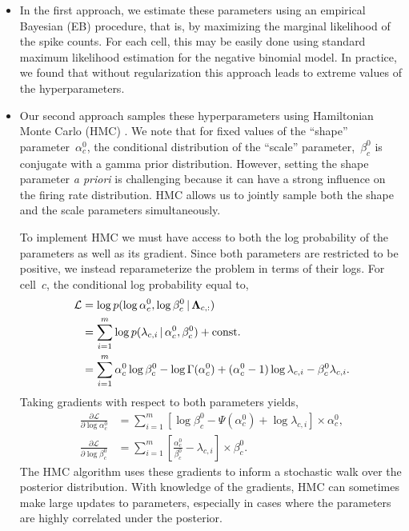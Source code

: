\begin{itemize}

\item In the first approach, we estimate these parameters   using an empirical Bayesian (EB) procedure, that is, by maximizing the marginal likelihood of the spike counts. 
For each cell, this may be easily done using standard maximum likelihood estimation for the negative binomial model. 
In practice, we found that without regularization this approach leads to extreme values of the hyperparameters.

 

\item Our second approach samples these hyperparameters using Hamiltonian Monte Carlo (HMC) \citep{Neal10}. We note that for fixed values of the ``shape'' parameter~$\alpha_c^0$, the conditional distribution of the ``scale'' parameter,~$\beta_c^0$ is conjugate with a gamma prior distribution. However, setting the shape parameter \textit{a priori} is challenging because it can have a strong influence on the firing rate distribution. HMC allows us to jointly sample both the shape and the scale parameters simultaneously.

To implement HMC we must have access to both the log probability of the parameters as well as its gradient. Since both parameters are restricted to be positive, we instead reparameterize the problem in terms of their logs. For cell~$c$, the conditional log probability equal to,
\begin{align}
\mathcal{L} &= \log p(\log \alpha_c^0, \log \beta_c^0 \,|\, \boldsymbol{\Lambda}_{c,:}) \\
\nonumber &= \sum_{i=1}^m \log p(\lambda_{c,i} \,|\, \alpha_c^0, \beta_c^0) + \text{const.} \\
\nonumber &= \sum_{i=1}^m \alpha_c^0 \log \beta_c^0 - \log \Gamma(\alpha_c^0) + (\alpha_c^0 - 1) \log \lambda_{c,i} - \beta_c^0 \lambda_{c,i}.
\end{align}
Taking gradients with respect to both parameters yields,
\begin{align}
\frac{\partial \mathcal{L}}{\partial \log \alpha_c^0} &= \sum_{i=1}^m \left[ \log \beta_c^0 -\Psi(\alpha_c^0) + \log \lambda_{c,i} \right] \times \alpha_c^0, \\
\nonumber \frac{\partial \mathcal{L}}{\partial \log \beta_c^0} &= \sum_{i=1}^m \left[ \frac{\alpha_c^0}{\beta_c^0}  - \lambda_{c,i} \right] \times \beta_c^0.
\end{align}
The HMC algorithm uses these gradients to inform a stochastic walk over the posterior distribution. With knowledge of the gradients, HMC can sometimes make large updates to parameters, especially in cases where the parameters are highly correlated under the posterior. 



\end{itemize}
